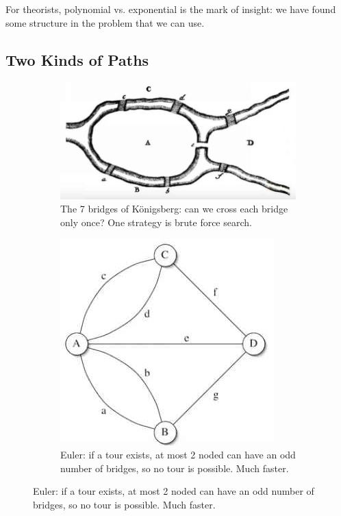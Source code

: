\documentclass[]{article}
\begin{document}
\cite[Chapters 1,2,4]{moore2011nature}

For theorists, polynomial vs. exponential is the mark of insight: we have found some structure in the problem that we can use.

\subsection{Two Kinds of Paths}

\begin{figure}[H]
	\caption{Eulerian paths}
	\begin{subfigure}[t]{0.54\textwidth}
		\caption{The 7 bridges of K\"onigsberg: can we cross each bridge only once? One strategy is brute force search.}
		\includegraphics[width=\textwidth]{euler}
	\end{subfigure}
	\begin{subfigure}[t]{0.54\textwidth}
		\caption{Euler: if a tour exists, at most 2 noded can have an odd number of bridges, so no tour is possible. Much faster.}
		\includegraphics[width=\textwidth]{euler2}
	\end{subfigure}
\end{figure}
\end{document}
